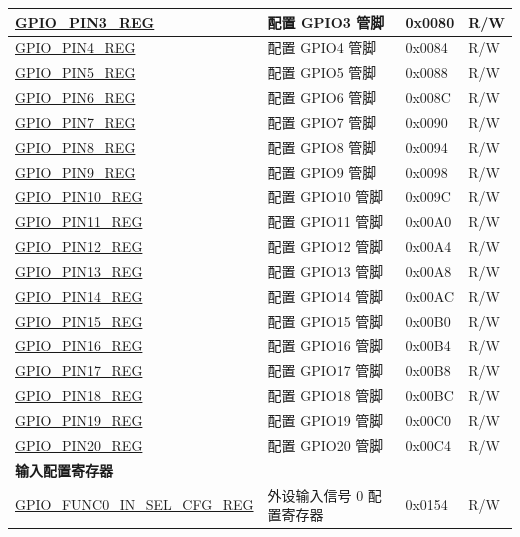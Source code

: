 \begin{longtable}{ | p{6cm} | p{6.7cm} | p{1.3cm} | p{1.5cm} | }
\hyperref[regdesc:GPIOPINNREG]{GPIO\_PIN3\_REG} & 配置 GPIO3 管脚& 0x0080 & R/W \\ \hline
\hyperref[regdesc:GPIOPINNREG]{GPIO\_PIN4\_REG} & 配置 GPIO4 管脚 & 0x0084 & R/W \\ \hline
\hyperref[regdesc:GPIOPINNREG]{GPIO\_PIN5\_REG} & 配置 GPIO5 管脚& 0x0088 & R/W \\ \hline
\hyperref[regdesc:GPIOPINNREG]{GPIO\_PIN6\_REG} & 配置 GPIO6 管脚 & 0x008C & R/W \\ \hline
\hyperref[regdesc:GPIOPINNREG]{GPIO\_PIN7\_REG} & 配置 GPIO7 管脚& 0x0090 & R/W \\ \hline
\hyperref[regdesc:GPIOPINNREG]{GPIO\_PIN8\_REG} & 配置 GPIO8 管脚 & 0x0094 & R/W \\ \hline
\hyperref[regdesc:GPIOPINNREG]{GPIO\_PIN9\_REG} & 配置 GPIO9 管脚 & 0x0098 & R/W \\ \hline
\hyperref[regdesc:GPIOPINNREG]{GPIO\_PIN10\_REG} & 配置 GPIO10 管脚& 0x009C & R/W \\ \hline
\hyperref[regdesc:GPIOPINNREG]{GPIO\_PIN11\_REG} & 配置 GPIO11 管脚 & 0x00A0 & R/W \\ \hline
\hyperref[regdesc:GPIOPINNREG]{GPIO\_PIN12\_REG} & 配置 GPIO12 管脚 & 0x00A4 & R/W \\ \hline
\hyperref[regdesc:GPIOPINNREG]{GPIO\_PIN13\_REG} & 配置 GPIO13 管脚 & 0x00A8 & R/W \\ \hline
\hyperref[regdesc:GPIOPINNREG]{GPIO\_PIN14\_REG} & 配置 GPIO14 管脚 & 0x00AC & R/W \\ \hline
\hyperref[regdesc:GPIOPINNREG]{GPIO\_PIN15\_REG} & 配置 GPIO15 管脚 & 0x00B0 & R/W \\ \hline
\hyperref[regdesc:GPIOPINNREG]{GPIO\_PIN16\_REG} & 配置 GPIO16 管脚 & 0x00B4 & R/W \\ \hline
\hyperref[regdesc:GPIOPINNREG]{GPIO\_PIN17\_REG} & 配置 GPIO17 管脚 & 0x00B8 & R/W \\ \hline
\hyperref[regdesc:GPIOPINNREG]{GPIO\_PIN18\_REG} & 配置 GPIO18 管脚 & 0x00BC & R/W \\ \hline
\hyperref[regdesc:GPIOPINNREG]{GPIO\_PIN19\_REG} & 配置 GPIO19 管脚 & 0x00C0 & R/W \\ \hline
\hyperref[regdesc:GPIOPINNREG]{GPIO\_PIN20\_REG} & 配置 GPIO20 管脚 & 0x00C4 & R/W \\ \hline
\multicolumn{4}{|l|}{\textbf{输入配置寄存器}} \\ \hline
\hyperref[regdesc:GPIOFUNCNINSELCFGREG]{GPIO\_FUNC0\_IN\_SEL\_CFG\_REG} & 外设输入信号 0 配置寄存器 & 0x0154 & R/W \\ \hline

\end{longtable}
